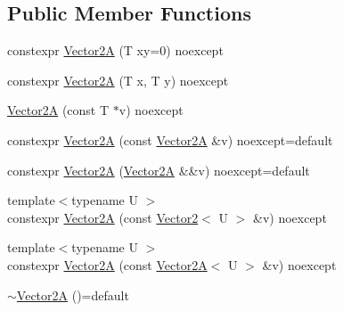 \subsection*{Public Member Functions}
\begin{DoxyCompactItemize}
\item 
constexpr \hyperlink{structmage_1_1_vector2_a_3_01_t_00_01typename_01std_1_1enable__if__t_3_01std_1_1is__arithmetic__b421e7a25afc1ac5972d3b452777021a_a150ffc5d1140565bb98b91396c799e4f}{Vector2A} (T xy=0) noexcept
\item 
constexpr \hyperlink{structmage_1_1_vector2_a_3_01_t_00_01typename_01std_1_1enable__if__t_3_01std_1_1is__arithmetic__b421e7a25afc1ac5972d3b452777021a_aa7c3f402cf4f85927540a09a9b73292b}{Vector2A} (T x, T y) noexcept
\item 
\hyperlink{structmage_1_1_vector2_a_3_01_t_00_01typename_01std_1_1enable__if__t_3_01std_1_1is__arithmetic__b421e7a25afc1ac5972d3b452777021a_a04d3fa414db780d57cb6ff066a32b6f9}{Vector2A} (const T $\ast$v) noexcept
\item 
constexpr \hyperlink{structmage_1_1_vector2_a_3_01_t_00_01typename_01std_1_1enable__if__t_3_01std_1_1is__arithmetic__b421e7a25afc1ac5972d3b452777021a_afb642f0fcbe2f1c72959c89aa28d2327}{Vector2A} (const \hyperlink{structmage_1_1_vector2_a}{Vector2A} \&v) noexcept=default
\item 
constexpr \hyperlink{structmage_1_1_vector2_a_3_01_t_00_01typename_01std_1_1enable__if__t_3_01std_1_1is__arithmetic__b421e7a25afc1ac5972d3b452777021a_ac5e14265e0492c4cd1cd360808e52820}{Vector2A} (\hyperlink{structmage_1_1_vector2_a}{Vector2A} \&\&v) noexcept=default
\item 
{\footnotesize template$<$typename U $>$ }\\constexpr \hyperlink{structmage_1_1_vector2_a_3_01_t_00_01typename_01std_1_1enable__if__t_3_01std_1_1is__arithmetic__b421e7a25afc1ac5972d3b452777021a_ae9c48d1037e56808e9d134ead5d47b79}{Vector2A} (const \hyperlink{structmage_1_1_vector2}{Vector2}$<$ U $>$ \&v) noexcept
\item 
{\footnotesize template$<$typename U $>$ }\\constexpr \hyperlink{structmage_1_1_vector2_a_3_01_t_00_01typename_01std_1_1enable__if__t_3_01std_1_1is__arithmetic__b421e7a25afc1ac5972d3b452777021a_a8faf646e956ae72c3ea8aa281b7026a5}{Vector2A} (const \hyperlink{structmage_1_1_vector2_a}{Vector2A}$<$ U $>$ \&v) noexcept
\item 
\hyperlink{structmage_1_1_vector2_a_3_01_t_00_01typename_01std_1_1enable__if__t_3_01std_1_1is__arithmetic__b421e7a25afc1ac5972d3b452777021a_a97b699ffbeb8d23bd79c14c13618e1c1}{$\sim$\+Vector2A} ()=default

\end{DoxyCompactItemize}
